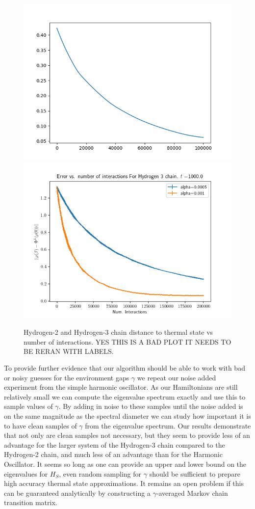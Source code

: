 \documentclass{article}
\begin{document}
\begin{figure}
    \centering
    \includegraphics[width=0.45\linewidth]{numerics/data/h2_chain_2.png}
    \includegraphics[width = 0.45\linewidth]{numerics/data/h3_chain_7.png}
    \caption{Hydrogen-2 and Hydrogen-3 chain distance to thermal state vs number of interactions. YES THIS IS A BAD PLOT IT NEEDS TO BE RERAN WITH LABELS.}
    \label{fig:h_chain_error}
\end{figure}

To provide further evidence that our algorithm should be able to work with bad or noisy guesses for the environment gaps $\gamma$ we repeat our noise added experiment from the simple harmonic oscillator. As our Hamiltonians are still relatively small we can compute the eigenvalue spectrum exactly and use this to sample values of $\gamma$. By adding in noise to these samples until the noise added is on the same magnitude as the spectral diameter we can study how important it is to have clean samples of $\gamma$ from the eigenvalue spectrum. Our results demonstrate that not only are clean samples not necessary, but they seem to provide less of an advantage for the larger system of the Hydrogen-3 chain compared to the Hydrogen-2 chain, and much less of an advantage than for the Harmonic Oscillator. It seems so long as one can provide an upper and lower bound on the eigenvalues for $H_S$, even random sampling for $\gamma$ should be sufficient to prepare high accuracy thermal state approximations. It remains an open problem if this can be guaranteed analytically by constructing a $\gamma$-averaged Markov chain transition matrix.
\end{document}

